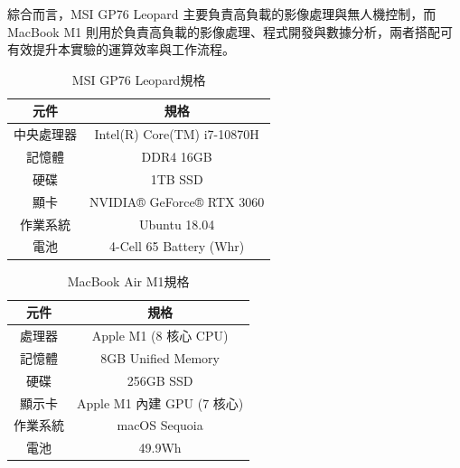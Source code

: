 \documentclass[12pt]{article}       %
\begin{document}
綜合而言，MSI GP76 Leopard 主要負責高負載的影像處理與無人機控制，而 MacBook M1 則用於負責高負載的影像處理、程式開發與數據分析，兩者搭配可有效提升本實驗的運算效率與工作流程。
\begin{table}[ht]
    \caption{MSI GP76 Leopard規格}
    \vspace{12pt} %
    \renewcommand{\arraystretch}{1.5} %
    \centering
    \begin{tabular}{|c|c|}
        \hline
        \textbf{元件} & \textbf{規格}                 \\ \hline
        中央處理器       & Intel(R) Core(TM) i7-10870H \\ \hline
        記憶體         & DDR4 16GB                   \\ \hline
        硬碟          & 1TB SSD                     \\ \hline
        顯卡          & NVIDIA® GeForce® RTX 3060   \\ \hline
        作業系統        & Ubuntu 18.04                \\ \hline
        電池          & 4-Cell 65 Battery (Whr)     \\ \hline
    \end{tabular}
    \label{tab:MSI GP76 Leopard}
\end{table}

\begin{table}[ht]
    \caption{MacBook Air M1規格}
    \vspace{12pt} %
    \renewcommand{\arraystretch}{1.5} %
    \centering
    \begin{tabular}{|c|c|}
        \hline
        \textbf{元件} & \textbf{規格}            \\ \hline
        處理器         & Apple M1 (8 核心 CPU)    \\ \hline
        記憶體         & 8GB Unified Memory     \\ \hline
        硬碟          & 256GB SSD              \\ \hline
        顯示卡         & Apple M1 內建 GPU (7 核心) \\ \hline
        作業系統        & macOS Sequoia          \\ \hline
        電池          & 49.9Wh                 \\ \hline
    \end{tabular}
    \label{tab:MacBook Air M1}
\end{table}
\end{document}
